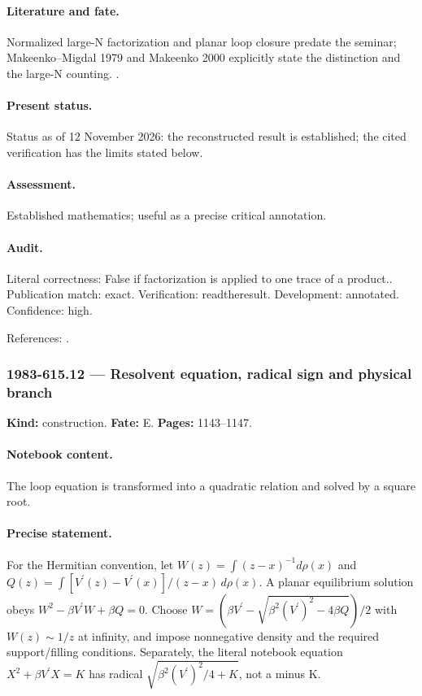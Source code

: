 \paragraph{Literature and fate.} Normalized large-N factorization and planar loop closure predate the seminar; Makeenko--Migdal 1979 and Makeenko 2000 explicitly state the distinction and the large-N counting. \citep{makeenkomigdal1979exact,makeenko2000large}.

\paragraph{Present status.} Status as of 12 November 2026: the reconstructed result is established; the cited verification has the limits stated below.

\paragraph{Assessment.} Established mathematics; useful as a precise critical annotation.

\paragraph{Audit.} Literal correctness: False if factorization is applied to one trace of a product.. Publication match: exact. Verification: readtheresult. Development: annotated. Confidence: high.

\noindent References: \citep{makeenkomigdal1979exact,makeenko2000large}.\par

\subsubsection{1983-615.12 --- Resolvent equation, radical sign and physical branch}

\label{item:1983-615.12}

\noindent\textbf{Kind:} construction. \textbf{Fate:} E. \textbf{Pages:} 1143--1147.\par

\paragraph{Notebook content.} The loop equation is transformed into a quadratic relation and solved by a square root.

\paragraph{Precise statement.} For the Hermitian convention, let $W(z)=\int(z-x)^{-1}d\rho(x)$ and $Q(z)=\int[V^{\prime}(z)-V^{\prime}(x)]/(z-x)\,d\rho(x)$. A planar equilibrium solution obeys $W^2-\beta V^{\prime}W+\beta Q=0$. Choose $W=(\beta V^{\prime}-\sqrt{\beta^2(V^{\prime})^2-4\beta Q})/2$ with $W(z)\sim1/z$ at infinity, and impose nonnegative density and the required support/filling conditions. Separately, the literal notebook equation $X^2+\beta V^{\prime}X=K$ has radical $\sqrt{\beta^2(V^{\prime})^2/4+K}$, not a minus K.

